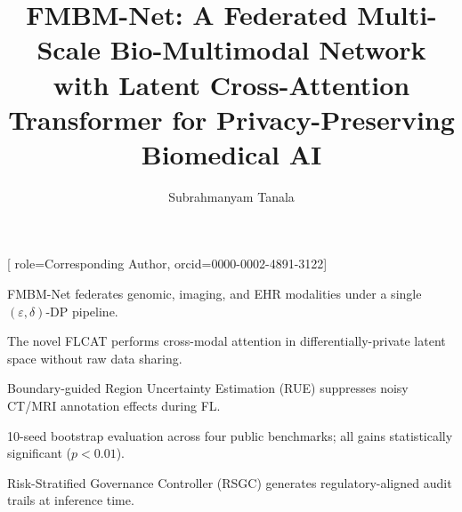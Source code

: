 \documentclass[a4paper,fleqn]{cas-dc}
\begin{document}
\let\WriteBookmarks\relax
\def\floatpagepagefraction{1}
\def\textpagefraction{.001}

\title[mode=title]{FMBM-Net: A Federated Multi-Scale Bio-Multimodal Network
with Latent Cross-Attention Transformer for Privacy-Preserving Biomedical AI}

\tnotemark[1]

\author[1]{Subrahmanyam Tanala}[
  role=Corresponding Author,
  orcid=0000-0002-4891-3122]
\cormark[1]
\fnmark[1]



\begin{highlights}
\item FMBM-Net federates genomic, imaging, and EHR modalities under a single $(\varepsilon,\delta)$-DP pipeline.
\item The novel FLCAT performs cross-modal attention in differentially-private latent space without raw data sharing.
\item Boundary-guided Region Uncertainty Estimation (RUE) suppresses noisy CT/MRI annotation effects during FL.
\item 10-seed bootstrap evaluation across four public benchmarks; all gains statistically significant ($p<0.01$).
\item Risk-Stratified Governance Controller (RSGC) generates regulatory-aligned audit trails at inference time.
\end{highlights}
\end{document}
